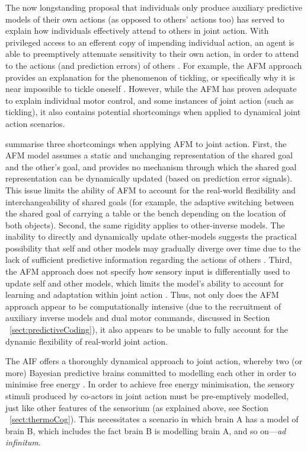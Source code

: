 \begin{CJK}{UTF8}{gbsn}
The now longstanding proposal that individuals only produce auxiliary predictive models of their own actions (as opposed to others' actions too) has served to explain how individuals effectively attend to others in joint action.  With privileged access to an efferent copy of impending individual action, an agent is able to preemptively attenuate sensitivity to their own action, in order to attend to the actions (and prediction errors) of others \citep{Wolpert1998}.  For example, the AFM approach provides an explanation for the phenomenon of tickling, or specifically why it is near impossible to tickle oneself \citep[due to sensory attenuation resulting from the self-generated predictions about the consequences of action][]{Blakemore2003}. However, while the AFM has proven adequate to explain individual motor control, and some instances of joint action (such as tickling), it also contains potential shortcomings when applied to dynamical joint action scenarios.

\textcite{Pesquita2017} summarise three shortcomings when applying AFM to joint action.  First, the AFM model assumes a static and unchanging representation of the shared goal and the other's goal, and provides no mechanism through which the shared goal representation can be dynamically updated (based on prediction error signals).  This issue limits the ability of AFM to account for the real-world flexibility and interchangeability of shared goals (for example, the adaptive switching between the shared goal of carrying a table or the bench depending on the location of both objects).  Second, the same rigidity applies to other-inverse models.  The inability to directly and dynamically update other-models suggests the practical possibility that self and other models may gradually diverge over time due to the lack of sufficient predictive information regarding the actions of others \citep{Pickering2014}. Third, the AFM approach does not specify how sensory input is differentially used to update self and other models, which limits the model's ability to account for learning and adaptation within joint action \citep{Pesquita2017}.  Thus, not only does the AFM approach appear to be computationally intensive (due to the recruitment of auxiliary inverse models and dual motor commands, discussed in Section ~\ref{sect:predictiveCoding}), it also appears to be unable to fully account for the dynamic flexibility of real-world joint action.

The AIF offers a thoroughly dynamical approach to joint action, whereby two (or more) Bayesian predictive brains committed to modelling each other in order to minimise free energy \citep{Friston2015,Friston2015a}. In order to achieve free energy minimisation, the sensory stimuli produced by co-actors in joint action must be pre-emptively modelled, just like other features of the sensorium (as explained above, see Section ~\ref{sect:thermoCog}).  This necessitates a scenario in which brain A has a model of brain B, which includes the fact brain B is modelling brain A, and so on---\textit{ad infinitum}.


\end{CJK}
